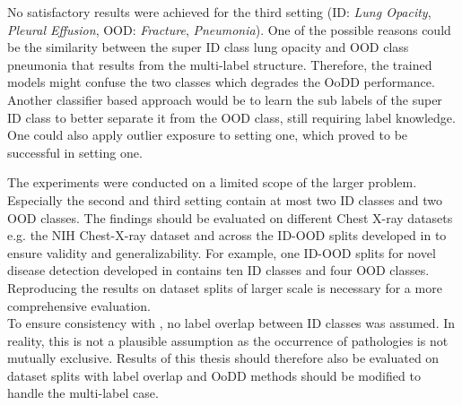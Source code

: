 \par
No satisfactory results were achieved for the third setting (ID: \textit{Lung Opacity}, \textit{Pleural Effusion}, OOD: \textit{Fracture}, \textit{Pneumonia}).
One of the possible reasons could be the similarity between the super ID class lung opacity and OOD class pneumonia that results from the multi-label structure. 
Therefore, the trained models might confuse the two classes which degrades the OoDD performance. 
Another classifier based approach would be to learn the sub labels of the super ID class to better separate it from the OOD class, still requiring label knowledge.
One could also apply outlier exposure to setting one, which proved to be successful in setting one.
\par
The experiments were conducted on a limited scope of the larger problem.
Especially the second and third setting contain at most two ID classes and two OOD classes.
The findings should be evaluated on different Chest X-ray datasets e.g. the NIH Chest-X-ray dataset \citep{Wang2017} and across the ID-OOD splits developed in \citep{Cao2020} to ensure validity and generalizability.
For example, one ID-OOD splits for novel disease detection developed in \citep{Cao2020} contains ten ID classes and four OOD classes.
Reproducing the results on dataset splits of larger scale is necessary for a more comprehensive evaluation.
\\
To ensure consistency with \citep{Berger2021}, no label overlap between ID classes was assumed. 
In reality, this is not a plausible assumption as the occurrence of pathologies is not mutually exclusive.
Results of this thesis should therefore also be evaluated on dataset splits with label overlap and OoDD methods should be modified to handle the multi-label case.
